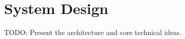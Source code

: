\section{System Design}
\label{sec:design}

TODO: Present the architecture and core technical ideas.
